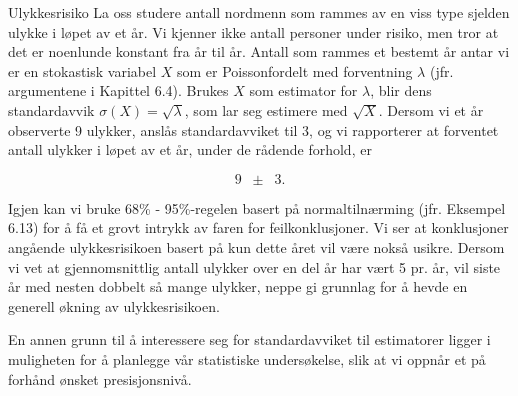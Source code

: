 \begin{eksempel}{Ulykkesrisiko}
La oss studere antall nordmenn som rammes av en viss type sjelden
ulykke i løpet av et år. Vi kjenner ikke antall personer under
risiko, men tror at det er noenlunde konstant fra år til år.
Antall som rammes et bestemt år antar vi er en stokastisk
variabel $X$ som er Poissonfordelt med forventning $\lambda$
(jfr. argumentene i Kapittel 6.4). Brukes $X$ som estimator for
$\lambda$, blir dens standardavvik $\sigma (X)= \sqrt{\lambda}$, som lar
seg estimere med $\sqrt{X}$. Dersom vi et år observerte 9 ulykker,
anslås standardavviket til 3, og vi rapporterer at forventet
antall ulykker i løpet av et år, under de rådende forhold, er

\[     9 \;\; \pm \;\; 3. \]

\noindent Igjen kan vi bruke 68\% - 95\%-regelen basert på normaltilnærming
(jfr. Eksempel 6.13) for å få et grovt intrykk av faren for
feilkonklusjoner. Vi ser at konklusjoner angående ulykkesrisikoen basert
 på kun dette året vil være nokså usikre. Dersom vi vet at
gjennomsnittlig antall ulykker over en del år har vært 5 pr. år,
vil siste år med nesten dobbelt så mange ulykker, neppe gi
grunnlag for å hevde en generell økning av ulykkesrisikoen.
\end{eksempel}

En annen grunn til å interessere seg for standardavviket til
estimatorer ligger i muligheten for å planlegge vår statistiske
undersøkelse, slik at vi oppnår et på forhånd ønsket
presisjonsnivå.\\

